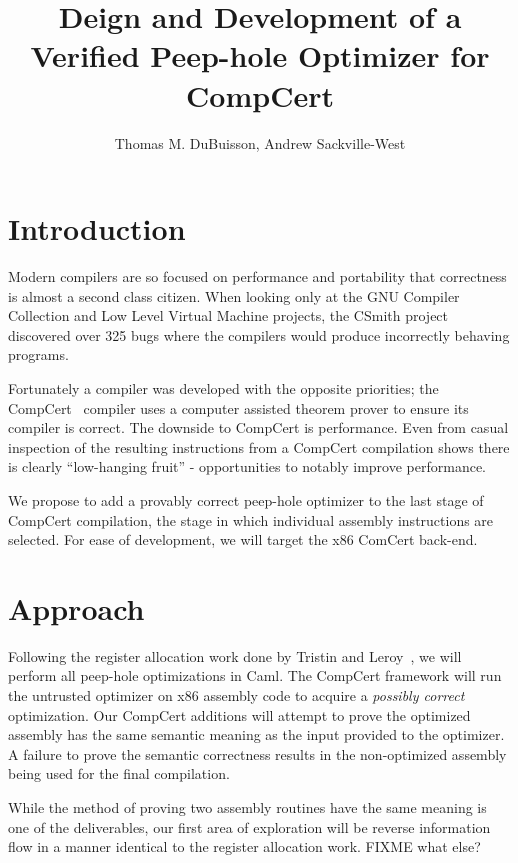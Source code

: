 \documentclass{exam}
\begin{document}
\title{Deign and Development of a Verified Peep-hole Optimizer for CompCert}

\author{Thomas M. Du{B}uisson, Andrew Sackville-West}
\maketitle

\section{Introduction}
Modern compilers are so focused on performance and portability that
correctness is almost a second class citizen.  When looking only at
the GNU Compiler Collection and Low Level Virtual Machine projects,
the CSmith project~\cite{csmith} discovered over 325 bugs where the
compilers would produce incorrectly behaving programs.

Fortunately a compiler was developed with the opposite priorities; the
CompCert~\cite{compcert} compiler uses a computer assisted theorem
prover to ensure its compiler is correct.  The downside to CompCert is
performance.  Even from casual inspection of the resulting
instructions from a CompCert compilation shows there is clearly
``low-hanging fruit'' - opportunities to notably improve performance.

We propose to add a provably correct peep-hole optimizer to the last
stage of CompCert compilation, the stage in which individual assembly
instructions are selected.  For ease of development, we will target
the x86 ComCert back-end.

\section{Approach}

Following the register allocation work done by Tristin and
Leroy~\cite{regalloc}, we will perform all peep-hole optimizations in
Caml.  The CompCert framework will run the untrusted optimizer on x86
assembly code to acquire a {\it possibly correct} optimization.  Our
CompCert additions will attempt to prove the optimized assembly has
the same semantic meaning as the input provided to the optimizer.  A
failure to prove the semantic correctness results in the non-optimized
assembly being used for the final compilation.

While the method of proving two assembly routines have the same
meaning is one of the deliverables, our first area of exploration will
be reverse information flow in a manner identical to the register
allocation work.  FIXME what else?
\end{document}
